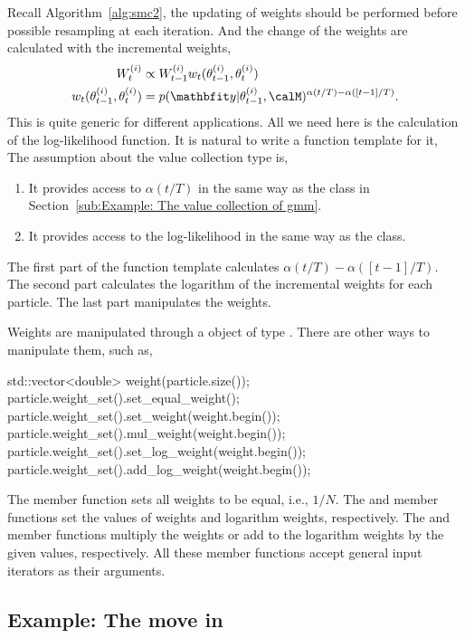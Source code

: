 Recall Algorithm~\ref{alg:smc2}, the updating of weights should be performed
before possible resampling at each iteration. And the change of the weights
are calculated with the incremental weights,
\begin{align*}
  W_t^{(i)} &\propto W_{t-1}^{(i)} w_t(\theta_{t-1}^{(i)}, \theta_t^{(i)}) \\
  w_t(\theta_{t-1}^{(i)}, \theta_t^{(i)}) &=
  p(\data|\theta_{t-1}^{(i)},\calM)^{\alpha(t/T) - \alpha([t-1]/T)}.
\end{align*}
This is quite generic for different applications. All we need here is the
calculation of the log-likelihood function. It is natural to write a function
template for it,
The assumption about the value collection type  is,
\begin{enumerate}
  \item It provides access to $\alpha(t/T)$ in the same way as the
     class in Section~\ref{sub:Example: The value collection of
      gmm}.
  \item It provides access to the log-likelihood in the same way as the
     class.
\end{enumerate}
The first part of the function template  calculates
$\alpha(t/T) - \alpha([t-1]/T)$. The second part calculates the logarithm of
the incremental weights for each particle. The last part manipulates the
weights.

Weights are manipulated through a object of type . There
are other ways to manipulate them, such as,
\begin{cppcode}
std::vector<double> weight(particle.size());
particle.weight_set().set_equal_weight();
particle.weight_set().set_weight(weight.begin());
particle.weight_set().mul_weight(weight.begin());
particle.weight_set().set_log_weight(weight.begin());
particle.weight_set().add_log_weight(weight.begin());
\end{cppcode}
The  member function sets all weights to be equal,
i.e., $1/N$. The  and  member
functions set the values of weights and logarithm weights, respectively. The
 and  member functions
multiply the weights or add to the logarithm weights by the given values,
respectively. All these member functions accept general input iterators as
their arguments.

\subsection{Example: The \protect\mcmc move in \protect\gmm}
\label{sub:Example: The mcmc move in gmm}

